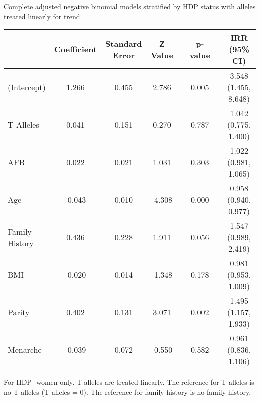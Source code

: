 \documentclass{standalone}
\begin{document}
\begin{threeparttable}
\caption{Complete adjusted negative binomial models stratified by HDP status with alleles treated linearly for trend}
\begin{tabular}{@{}lccccccc@{}}
  \toprule
 & Coefficient & Standard Error & Z Value & \hspace{1em} & p-value & \hspace{1em} & IRR (95\% CI) \\ 
  \midrule
(Intercept) & 1.266 & 0.455 & 2.786 && 0.005 && 3.548 (1.455, 8.648) \\ 
  T Alleles\phantom{abcdefghijklm} & 0.041 & 0.151 & 0.270 && 0.787 && 1.042 (0.775, 1.400) \\ 
  AFB & 0.022 & 0.021 & 1.031 && 0.303 && 1.022 (0.981, 1.065) \\ 
  Age & -0.043 & 0.010 & -4.308 && 0.000 && 0.958 (0.940, 0.977) \\ 
  Family History & 0.436 & 0.228 & 1.911 && 0.056 && 1.547 (0.989, 2.419) \\ 
  BMI & -0.020 & 0.014 & -1.348 && 0.178 && 0.981 (0.953, 1.009) \\ 
  Parity & 0.402 & 0.131 & 3.071 && 0.002 && 1.495 (1.157, 1.933) \\ 
  Menarche & -0.039 & 0.072 & -0.550 && 0.582 && 0.961 (0.836, 1.106) \\
   \bottomrule
\end{tabular}
\begin{tablenotes}
\small
\item For HDP- women only. T alleles are treated linearly. The reference for T alleles is no T alleles (T alleles = 0). The reference for family history is no family history.
\end{tablenotes}
\end{threeparttable}
\end{document}
